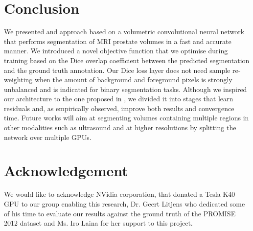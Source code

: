 \documentclass{llncs}
\begin{document}
\section{Conclusion}
We presented and approach based on a volumetric convolutional neural network that performs segmentation of MRI prostate volumes in a fast and accurate manner. We introduced a novel objective function that we optimise during training based on the Dice overlap coefficient between the predicted segmentation and the ground truth annotation. Our Dice loss layer does not need sample re-weighting when the amount of background and foreground pixels is strongly unbalanced and is indicated for binary segmentation tasks. Although we inspired our architecture to the one proposed in \cite{ronneberger2015u}, we divided it into stages that learn residuals and, as empirically observed, improve both results and convergence time. Future works will aim at segmenting volumes containing multiple regions in other modalities such as ultrasound and at higher resolutions by splitting the network over multiple GPUs. 

\section{Acknowledgement}
We would like to acknowledge NVidia corporation, that donated a Tesla K40 GPU to our group enabling this research, Dr. Geert Litjens who dedicated some of his time to evaluate our results against the ground truth of the PROMISE 2012 dataset and Ms. Iro Laina for her support to this project. 


\end{document}
